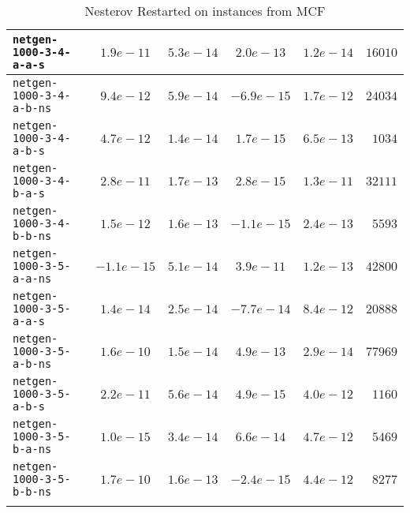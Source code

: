 \begin{center}
\begin{longtable}{|l || c | c | c | c | r|}
\hline
\texttt{netgen-1000-3-4-a-a-s} & $1.9e-11$ & $5.3e-14$ & $2.0e-13$ & $1.2e-14$ & $16010$ \\
\hline
\texttt{netgen-1000-3-4-a-b-ns} & $9.4e-12$ & $5.9e-14$ & $-6.9e-15$ & $1.7e-12$ & $24034$ \\
\hline
\texttt{netgen-1000-3-4-a-b-s} & $4.7e-12$ & $1.4e-14$ & $1.7e-15$ & $6.5e-13$ & $1034$ \\
\hline
\texttt{netgen-1000-3-4-b-a-s} & $2.8e-11$ & $1.7e-13$ & $2.8e-15$ & $1.3e-11$ & $32111$ \\
\hline
\texttt{netgen-1000-3-4-b-b-ns} & $1.5e-12$ & $1.6e-13$ & $-1.1e-15$ & $2.4e-13$ & $5593$ \\
\hline
\texttt{netgen-1000-3-5-a-a-ns} & $-1.1e-15$ & $5.1e-14$ & $3.9e-11$ & $1.2e-13$ & $42800$ \\
\hline
\texttt{netgen-1000-3-5-a-a-s} & $1.4e-14$ & $2.5e-14$ & $-7.7e-14$ & $8.4e-12$ & $20888$ \\
\hline
\texttt{netgen-1000-3-5-a-b-ns} & $1.6e-10$ & $1.5e-14$ & $4.9e-13$ & $2.9e-14$ & $77969$ \\
\hline
\texttt{netgen-1000-3-5-a-b-s} & $2.2e-11$ & $5.6e-14$ & $4.9e-15$ & $4.0e-12$ & $1160$ \\
\hline
\texttt{netgen-1000-3-5-b-a-ns} & $1.0e-15$ & $3.4e-14$ & $6.6e-14$ & $4.7e-12$ & $5469$ \\
\hline
\texttt{netgen-1000-3-5-b-b-ns} & $1.7e-10$ & $1.6e-13$ & $-2.4e-15$ & $4.4e-12$ & $8277$ \\
\hline
\caption{Nesterov Restarted on instances from MCF}
\label{ltb:NesterovRestartedDIMACS}
\end{longtable}
\end{center}
